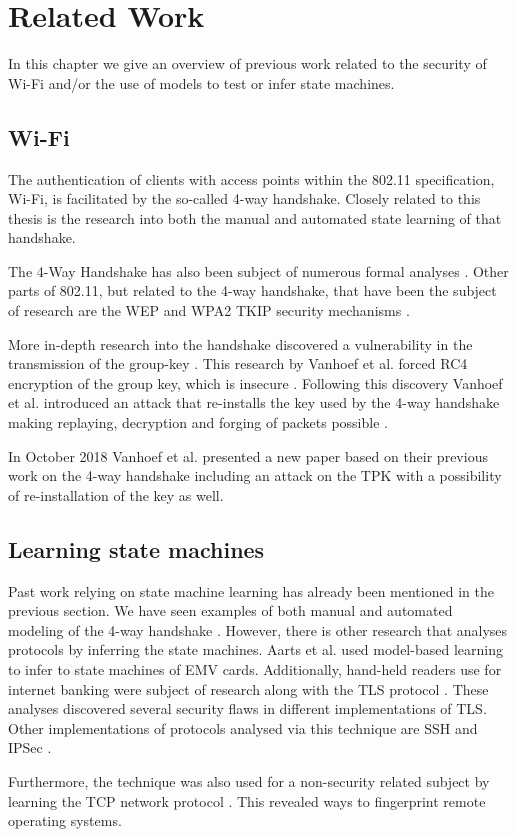 \chapter{Related Work}\label{relatedwork}

In this chapter we give an overview of previous work related to the security of Wi-Fi and/or the use of models to test or infer state machines.

\section{Wi-Fi}

The authentication of clients with access points within the 802.11 specification, Wi-Fi, is facilitated by the so-called 4-way handshake. Closely related to this thesis is the research into both the manual \cite{Vanhoef:2017} and automated \cite{Stone:2018} state learning of that handshake.

The 4-Way Handshake has also been subject of numerous formal analyses \cite{He:2004,Dong:2009,Xing:2008,He:2005}. Other parts of 802.11, but related to the 4-way handshake, that have been the subject of research are the WEP and WPA2 TKIP security mechanisms \cite{Fluhrer:2001,Vanhoef:2013}.

More in-depth research into the handshake discovered a vulnerability in the transmission of the group-key \cite{Vanhoef:2016}. This research by Vanhoef et al. forced RC4 encryption of the group key, which is insecure \cite{Fluhrer:2001}. Following this discovery Vanhoef et al. introduced an attack that re-installs the key used by the 4-way handshake making replaying, decryption and forging of packets possible \cite{Vanhoef:2017-2}.

In October 2018 Vanhoef et al. presented a new paper \cite{Vanhoef:2018} based on their previous work on the 4-way handshake including an attack on the TPK with a possibility of re-installation of the key as well. 

\section{Learning state machines}

Past work relying on state machine learning has already been mentioned in the previous section. We have seen examples of both manual and automated modeling of the 4-way handshake \cite{Vanhoef:2017,Stone:2018}. However, there is other research that analyses protocols by inferring the state machines. Aarts et al. \cite{Aarts:2013} used model-based learning to infer to state machines of EMV cards. Additionally, hand-held readers use for internet banking were subject of research \cite{Chalupar:2014} along with the TLS protocol \cite{Ruiter:2015,Thoor:2018}. These analyses discovered several security flaws in different implementations of TLS. Other implementations of protocols analysed via this technique are SSH \cite{Brostean:2017,Tijssen:2015} and IPSec \cite{Veldhuizen:2017}.

Furthermore, the technique was also used for a non-security related subject by learning the TCP network protocol \cite{Brostean:2014}. This revealed ways to fingerprint remote operating systems.